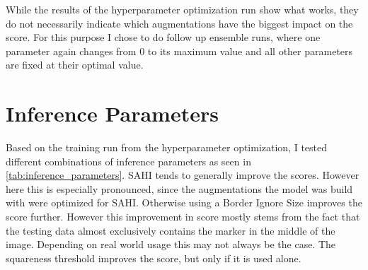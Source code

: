 \documentclass[10pt]{book}
\begin{document}
While the results of the hyperparameter optimization run show what works, they do not necessarily indicate which augmentations have the biggest impact on the score. For this purpose I chose to do follow up ensemble runs, where one parameter again changes from 0 to its maximum value and all other parameters are fixed at their optimal value.


\section{Inference Parameters}

Based on the training run from the hyperparameter optimization, I tested different combinations of inference parameters as seen in \autoref{tab:inference_parameters}. \ac{SAHI} tends to generally improve the scores. However here this is especially pronounced, since the augmentations the model was build with were optimized for \ac{SAHI}. Otherwise using a Border Ignore Size improves the score further. However this improvement in score mostly stems from the fact that the testing data almost exclusively contains the marker in the middle of the image. Depending on real world usage this may not always be the case. The squareness threshold improves the score, but only if it is used alone. 
\end{document}
